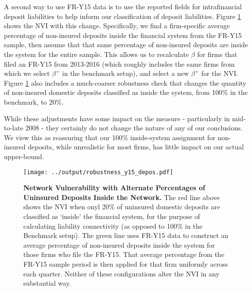 A second way to use FR-Y15 data is to use the reported fields for intrafinancial deposit liabilities to help inform our classification of deposit liabilities. Figure \ref{fig:nvi_custodian} shows the NVI with this change. Specifically, we find a firm-specific average percentage of non-insured deposits inside the financial system from the FR-Y15 sample, then assume that that same percentage of non-insured deposits are inside the system for the entire sample. This allows us to recalculate $\beta$ for firms that filed an FR-Y15 from 2013-2016 (which roughly includes the same firms from which we select $\beta^+$ in the benchmark setup), and select a new $\beta^+$ for the NVI. Figure \ref{fig:nvi_custodian} also includes a much-coarser robustness check that changes the quantity of non-insured domestic deposits classified as inside the system, from 100\% in the benchmark, to 20\%.

While these adjustments have some impact on the measure - particularly in mid-to-late 2008 - they certainly do not change the nature of any of our conclusions. We view this as reassuring that our 100\% inside-system assignment for non-insured deposits, while unrealistic for most firms, has little impact on our actual upper-bound.

\begin{figure}[H]
\begin{center}
\texttt{[image: ../output/robustness\_y15\_depos.pdf]}
\end{center}
\caption[]{\textbf{Network Vulnerability with Alternate Percentages of Uninsured Deposits Inside the Network.} The red line above shows the NVI when onyl 20\% of uninsured domestic deposits are classified as `inside' the financial system, for the purpose of calculating liability connectivity (as opposed to 100\% in the Benchmark setup). The green line uses FR-Y15 data to construct an average percentage of non-insured deposits inside the system for those firms who file the FR-Y15. That average percentage from the FR-Y15 sample period is then applied for that firm uniformly across each quarter. Neither of these configurations alter the NVI in any substantial way.}\label{fig:nvi_custodian}
\end{figure}

